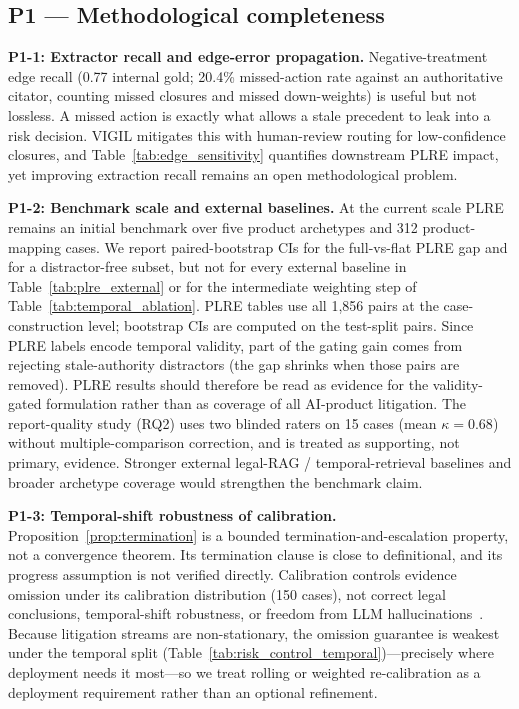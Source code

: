 \subsection*{P1 --- Methodological completeness}

\textbf{P1-1: Extractor recall and edge-error propagation.}
Negative-treatment edge recall (0.77 internal gold; 20.4\% missed-action rate against an authoritative citator, counting missed closures and missed down-weights) is useful but not lossless. A missed action is exactly what allows a stale precedent to leak into a risk decision. VIGIL mitigates this with human-review routing for low-confidence closures, and Table~\ref{tab:edge_sensitivity} quantifies downstream PLRE impact, yet improving extraction recall remains an open methodological problem.

\textbf{P1-2: Benchmark scale and external baselines.}
At the current scale PLRE remains an initial benchmark over five product archetypes and 312 product-mapping cases. We report paired-bootstrap CIs for the full-vs-flat PLRE gap and for a distractor-free subset, but not for every external baseline in Table~\ref{tab:plre_external} or for the intermediate weighting step of Table~\ref{tab:temporal_ablation}. PLRE tables use all 1{,}856 pairs at the case-construction level; bootstrap CIs are computed on the test-split pairs. Since PLRE labels encode temporal validity, part of the gating gain comes from rejecting stale-authority distractors (the gap shrinks when those pairs are removed). PLRE results should therefore be read as evidence for the validity-gated formulation rather than as coverage of all AI-product litigation. The report-quality study (RQ2) uses two blinded raters on 15 cases (mean $\kappa{=}0.68$) without multiple-comparison correction, and is treated as supporting, not primary, evidence. Stronger external legal-RAG / temporal-retrieval baselines and broader archetype coverage would strengthen the benchmark claim.

\textbf{P1-3: Temporal-shift robustness of calibration.}
Proposition~\ref{prop:termination} is a bounded termination-and-escalation property, not a convergence theorem. Its termination clause is close to definitional, and its progress assumption is not verified directly. Calibration controls evidence omission under its calibration distribution (150 cases), not correct legal conclusions, temporal-shift robustness, or freedom from LLM hallucinations~\citep{dahl2024hallucinating}. Because litigation streams are non-stationary, the omission guarantee is weakest under the temporal split (Table~\ref{tab:risk_control_temporal})---precisely where deployment needs it most---so we treat rolling or weighted re-calibration as a deployment requirement rather than an optional refinement.

